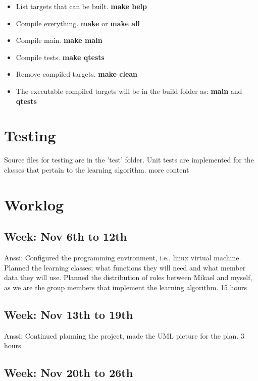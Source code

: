\documentclass{article}
\begin{document}
\begin{itemize}
  \item List targets that can be built. \textbf{make help}

 \item Compile everything. \textbf{make} or \textbf{make all}

 \item Compile main. \textbf{make main}

 \item Compile tests. \textbf{make qtests}

 \item Remove compiled targets. \textbf{make clean}

 \item The executable compiled targets will be in the build folder as:
  \textbf{main} and \textbf{qtests}
\end{itemize}

\section{Testing}

Source files for testing are in the 'test' folder. Unit tests
are implemented for
the classes that pertain to the learning algorithm. more content


\section{Worklog}

\subsection{Week: Nov 6th to 12th}

Anssi:
Configured the programming environment, i.e., linux virtual machine.
Planned the learning classes; what functions they will need and what
member data they will use. Planned the distribution of roles between
Mikael and myself, as we are the group members that implement the learning
algorithm.
15 hours

\subsection{Week: Nov 13th to 19th}

Anssi:
Continued planning the project, made the UML picture for the plan.
3 hours

\subsection{Week: Nov 20th to 26th}
\end{document}
